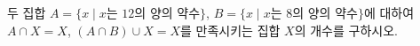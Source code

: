 두 집합 $A=\{x \mid x$는 $12$의 양의 약수$\}$, $B=\{x \mid x$는 $8$의 양의 약수$\}$에 대하여 $A\cap X=X$, $(A\cap B)\cup X=X$를 만족시키는 집합 $X$의 개수를 구하시오.
